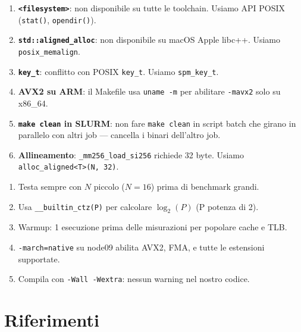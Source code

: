 \documentclass[11pt,a4paper]{article}
\begin{document}
\begin{warnbox}[title=\textbf{Pitfall implementativi}]
\begin{enumerate}
    \item \textbf{\texttt{<filesystem>}}: non disponibile su tutte le toolchain. Usiamo API POSIX (\texttt{stat()}, \texttt{opendir()}).
    \item \textbf{\texttt{std::aligned\_alloc}}: non disponibile su macOS Apple libc++. Usiamo \texttt{posix\_memalign}.
    \item \textbf{\texttt{key\_t}}: conflitto con POSIX \texttt{key\_t}. Usiamo \texttt{spm\_key\_t}.
    \item \textbf{AVX2 su ARM}: il Makefile usa \texttt{uname -m} per abilitare \texttt{-mavx2} solo su x86\_64.
    \item \textbf{\texttt{make clean} in SLURM}: non fare \texttt{make clean} in script batch che girano in parallelo con altri job --- cancella i binari dell'altro job.
    \item \textbf{Allineamento}: \texttt{\_mm256\_load\_si256} richiede 32 byte. Usiamo \texttt{alloc\_aligned<T>(N, 32)}.
\end{enumerate}
\end{warnbox}

\begin{tipbox}[title=\textbf{Best practices}]
\begin{enumerate}
    \item Testa sempre con $N$ piccolo ($N=16$) prima di benchmark grandi.
    \item Usa \texttt{\_\_builtin\_ctz(P)} per calcolare $\log_2(P)$ (P potenza di 2).
    \item Warmup: 1 esecuzione prima delle misurazioni per popolare cache e TLB.
    \item \texttt{-march=native} su node09 abilita AVX2, FMA, e tutte le estensioni supportate.
    \item Compila con \texttt{-Wall -Wextra}: nessun warning nel nostro codice.
\end{enumerate}
\end{tipbox}


\section{Riferimenti}
\end{document}
